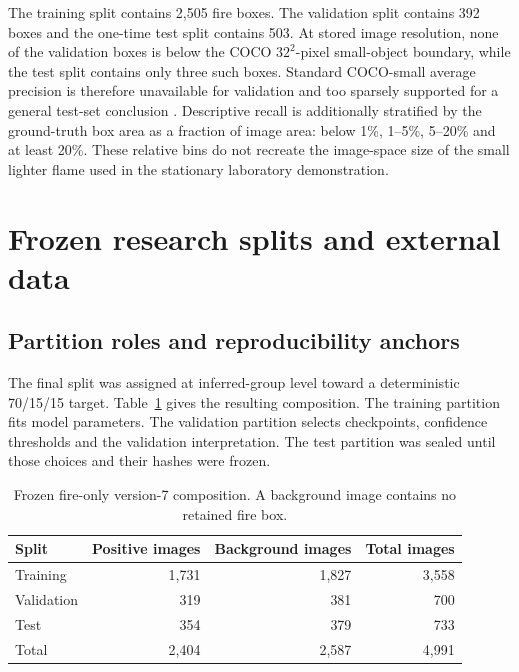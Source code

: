 The training split contains 2,505 fire boxes. The validation split contains
392 boxes and the one-time test split contains 503. At stored image resolution,
none of the validation boxes is below the COCO $32^2$-pixel small-object
boundary, while the test split contains only three such boxes. Standard
COCO-small average precision is therefore unavailable for validation and too
sparsely supported for a general test-set conclusion \cite{Lin2014COCO}.
Descriptive recall is additionally stratified by the ground-truth box area as
a fraction of image area: below 1\%, 1--5\%, 5--20\% and at least 20\%.
These relative bins do not recreate the image-space size of the small lighter
flame used in the stationary laboratory demonstration.

\section{Frozen research splits and external data}
\label{sec:data-models:3}

\subsection{Partition roles and reproducibility anchors}

The final split was assigned at inferred-group level toward a deterministic
70/15/15 target. Table~\ref{tab:dataset-splits} gives the resulting composition.
The training partition fits model parameters. The validation partition selects
checkpoints, confidence thresholds and the validation interpretation. The test
partition was sealed until those choices and their hashes were frozen.

\begin{table}[H]
  \centering
  \caption{Frozen fire-only version-7 composition. A background image contains
  no retained fire box.}
  \label{tab:dataset-splits}
  \begin{tabular}{lrrr}
    \toprule
    Split & Positive images & Background images & Total images \\
    \midrule
    Training & 1,731 & 1,827 & 3,558 \\
    Validation & 319 & 381 & 700 \\
    Test & 354 & 379 & 733 \\
    \midrule
    Total & 2,404 & 2,587 & 4,991 \\
    \bottomrule
  \end{tabular}
\end{table}

